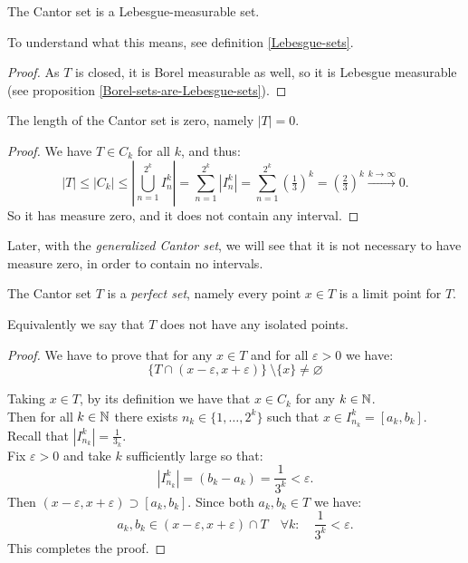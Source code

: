 \begin{prop}
	The Cantor set is a Lebesgue-measurable set.
\end{prop}
To understand what this means, see definition \vref{Lebesgue-sets}.
\begin{proof}
	As $T$ is closed, it is Borel measurable as well, so it is Lebesgue measurable (see proposition \vref{Borel-sets-are-Lebesgue-sets}).
\end{proof}

\begin{prop}\label{Cantor-set-zero-measure}
	The length of the Cantor set is zero, namely $|T| = 0$.
\end{prop}
\begin{proof}
	We have $T \in C_k $ for all $k$, and thus:
	$$
	|T| 
	\le |C_k| 
	\le |\bigcup_{n=1}^{2^k} I_n^k| 
	= \sum_{n=1}^{2^k} |I_n^k| 
	= \sum_{n=1}^{2^k} \left( \tfrac 1 3 \right)^k 
	= \left( \tfrac 2 3 \right)^k
	\xrightarrow{k \to \infty} 0
	.
	$$
	So it has measure zero, and it does not contain any interval.
\end{proof}
Later, with the \textit{generalized Cantor set}, we will see that it is not necessary to have measure zero, in order to contain no intervals.

\begin{prop}\label{prop-cantor-set-perfect}
	The Cantor set $T$ is a \emph{perfect set}, namely every point $x \in T$ is a limit point for $T$. 
\end{prop}	
Equivalently we say that $T$ does not have any isolated points.
\begin{proof}
	We have to prove that for any $x \in T$ and for all $\varepsilon > 0$ we have:
	\[
	\{T \cap (x - \varepsilon, x + \varepsilon)\} \ \setminus \{x\} 
	\neq \varnothing
	\]
	
	Taking $x\in T$, by its definition we have that $x \in C_k$ for any $k \in \mathbb N$.\\
	Then for all $k \in \mathbb N$ there exists $n_k \in \{1, \ldots , 2^k\}$ such that $x \in I_{n_k}^k = [a_k, b_k]$.
	Recall that $|I_{n_k}^k| = \frac 1 {3_k}$.\\
	Fix $\varepsilon > 0$ and take $k$ sufficiently large so that: 
	$$
	|I_{n_k}^k|
	=(b_k -a_k)
	=\frac 1 {3^k} 
	< \varepsilon
	.
	$$
	Then $(x-\varepsilon, x + \varepsilon) \supset [a_k,b_k]$.
	Since both $a_k, b_k \in T$ we have:
	$$
	a_k, b_k 
	\in (x-\varepsilon, x+ \varepsilon) \cap T 
	\quad \forall k: 
	\quad \frac 1 {3^k} 
	< \varepsilon
	.$$
	This completes the proof.
\end{proof}

